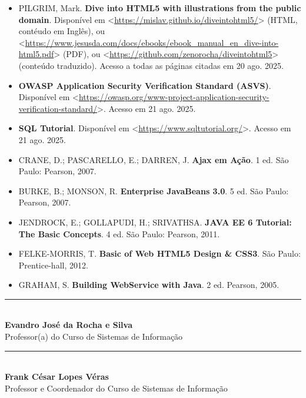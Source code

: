 \documentclass[a4paper, 12pt]{article}
\begin{document}
\begin{itemize}
    \item PILGRIM, Mark. \textbf{Dive into HTML5 with illustrations from the public domain}. Disponível em <\url{https://mislav.github.io/diveintohtml5/}> (HTML, contéudo em Inglês), ou <\url{https://www.jesusda.com/docs/ebooks/ebook_manual_en_dive-into-html5.pdf}> (PDF), ou <\url{https://github.com/zenorocha/diveintohtml5}> (conteúdo traduzido). Acesso a todas as páginas citadas em 20 ago. 2025.
    \item \textbf{OWASP Application Security Verification Standard (ASVS)}. Disponível em <\url{https://owasp.org/www-project-application-security-verification-standard/}>. Acesso em 21 ago. 2025.
    \item \textbf{SQL Tutorial}. Disponível em <\url{https://www.sqltutorial.org/}>. Acesso em 21 ago. 2025.
    \item CRANE, D.; PASCARELLO, E.; DARREN, J. \textbf{Ajax em Ação}. 1 ed. São Paulo: Pearson, 2007.
    \item BURKE, B.; MONSON, R. \textbf{Enterprise JavaBeans 3.0}. 5 ed. São Paulo: Pearson, 2007.
    \item JENDROCK, E.; GOLLAPUDI, H.; SRIVATHSA. \textbf{JAVA EE 6 Tutorial: The Basic Concepts}. 4 ed. São Paulo: Pearson, 2011.
    \item FELKE-MORRIS, T. \textbf{Basic of Web HTML5 Design \& CSS3}. São Paulo: Prentice-hall, 2012.
    \item GRAHAM, S. \textbf{Building WebService with Java}. 2 ed. Pearson, 2005.
\end{itemize}


\vfill
\begin{center}
    \rule{6cm}{0.4pt} \\ 
    \textbf{Evandro José da Rocha e Silva} \\
    Professor(a) do Curso de Sistemas de Informação \\[1.5cm]
    
    \rule{6cm}{0.4pt} \\ 
    \textbf{Frank César Lopes Véras} \\
    Professor e Coordenador do Curso de Sistemas de Informação
\end{center}
    
\end{document}
